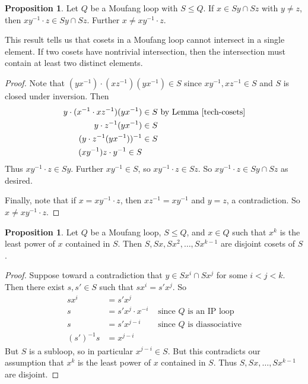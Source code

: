 \documentclass[12pt, twoside, openright]{report}
\theoremstyle{definition}
\newtheorem{prp}[thm]{Proposition}
\begin{document}
\begin{prp}
  Let $Q$ be a Moufang loop with $S\leq Q$. If $x\in Sy\cap Sz$ with $y\neq z$, then $xy^{-1}\cdot z\in Sy\cap Sz$.
    Further $x\neq xy^{-1}\cdot z$.
\end{prp}

This result tells us that cosets in a Moufang loop cannot intersect in a single element. If two cosets have
  nontrivial intersection, then the intersection must contain at least two distinct elements.

\begin{proof}
  Note that $(yx^{-1})\cdot (xz^{-1})(yx^{-1})\in S$ since $xy^{-1}, xz^{-1}\in S$ and $S$ is closed
    under inversion. Then
  \begin{align*}
    y\cdot(x^{-1}\cdot xz^{-1})(yx^{-1})&\in S\text{ by Lemma \ref{tech-cosets}}\\
    y\cdot z^{-1}(yx^{-1}) &\in S\\
    (y\cdot z^{-1}(yx^{-1}))^{-1} &\in S\\
    (xy^{-1})z\cdot y^{-1}\in S
  \end{align*}
  Thus $xy^{-1}\cdot z\in Sy$. Further $xy^{-1}\in S$, so $xy^{-1}\cdot z \in Sz$. So
    $xy^{-1}\cdot z\in Sy\cap Sz$ as desired.

  Finally, note that if $x = xy^{-1}\cdot z $, then $xz^{-1} = xy^{-1}$ and $y = z $, a
    contradiction. So $x\neq xy^{-1}\cdot z$.
\end{proof}

\begin{prp}\label{power-cosets}
  Let $Q$ be a Moufang loop, $S\leq Q$, and $x\in Q$ such that $x^k$ is the least power of $x$
    contained in $S$. Then $S, Sx, Sx^2, \ldots, Sx^{k - 1}$ are disjoint cosets of $S$.
\end{prp}

\begin{proof}
  Suppose toward a contradiction that $y\in Sx^i\cap Sx^j$ for some $i < j < k$. Then there
    exist $s, s'\in S$ such that $sx^i = s'x^j$. So
  \begin{align*}
    sx^i &= s'x^j\\
    s &= s'x^j\cdot x^{-i} &\text{ since $Q$ is an IP loop}\\
    s &= s'x^{j - i} &\text{ since $Q$ is diassociative}\\
    (s')^{-1}s &= x^{j - i}
  \end{align*}
  But $S$ is a subloop, so in particular $x^{j - i}\in S$. But this contradicts our assumption
    that $x^k$ is the least power of $x$ contained in $S$. Thus $S, Sx, \ldots, Sx^{k - 1}$ are disjoint.
\end{proof}
\end{document}
